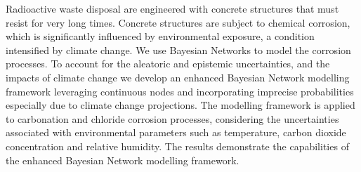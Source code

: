 Radioactive waste disposal are engineered with concrete structures that must resist for very long times. 
Concrete structures are subject to chemical corrosion, which is significantly influenced by environmental exposure, a condition intensified by climate change.
We use Bayesian Networks to model the corrosion processes. 
To account for the aleatoric and epistemic uncertainties, and the impacts of climate change we develop an enhanced Bayesian Network modelling framework leveraging continuous nodes and incorporating imprecise probabilities especially due to climate change projections. 
The modelling framework is applied to carbonation and chloride corrosion processes, considering the uncertainties associated with environmental parameters such as temperature, carbon dioxide concentration and relative humidity.
The results demonstrate the capabilities of the enhanced Bayesian Network modelling framework.